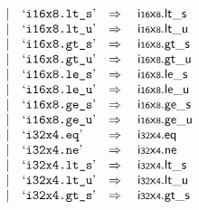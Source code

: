 $$\begin{array}[t]{@{}lrrl@{}l@{}l@{}l@{}}
& & | & \mbox{‘\texttt{i16x8.lt\_s}’} & \quad\Rightarrow\quad{} & {\mathsf{i{\scriptstyle 16}}}{\mathsf{x}}{\mathsf{{\scriptstyle 8}}} {.} {\mathsf{lt}}{\mathsf{\_}}{\mathsf{s}} \\
& & | & \mbox{‘\texttt{i16x8.lt\_u}’} & \quad\Rightarrow\quad{} & {\mathsf{i{\scriptstyle 16}}}{\mathsf{x}}{\mathsf{{\scriptstyle 8}}} {.} {\mathsf{lt}}{\mathsf{\_}}{\mathsf{u}} \\
& & | & \mbox{‘\texttt{i16x8.gt\_s}’} & \quad\Rightarrow\quad{} & {\mathsf{i{\scriptstyle 16}}}{\mathsf{x}}{\mathsf{{\scriptstyle 8}}} {.} {\mathsf{gt}}{\mathsf{\_}}{\mathsf{s}} \\
& & | & \mbox{‘\texttt{i16x8.gt\_u}’} & \quad\Rightarrow\quad{} & {\mathsf{i{\scriptstyle 16}}}{\mathsf{x}}{\mathsf{{\scriptstyle 8}}} {.} {\mathsf{gt}}{\mathsf{\_}}{\mathsf{u}} \\
& & | & \mbox{‘\texttt{i16x8.le\_s}’} & \quad\Rightarrow\quad{} & {\mathsf{i{\scriptstyle 16}}}{\mathsf{x}}{\mathsf{{\scriptstyle 8}}} {.} {\mathsf{le}}{\mathsf{\_}}{\mathsf{s}} \\
& & | & \mbox{‘\texttt{i16x8.le\_u}’} & \quad\Rightarrow\quad{} & {\mathsf{i{\scriptstyle 16}}}{\mathsf{x}}{\mathsf{{\scriptstyle 8}}} {.} {\mathsf{le}}{\mathsf{\_}}{\mathsf{u}} \\
& & | & \mbox{‘\texttt{i16x8.ge\_s}’} & \quad\Rightarrow\quad{} & {\mathsf{i{\scriptstyle 16}}}{\mathsf{x}}{\mathsf{{\scriptstyle 8}}} {.} {\mathsf{ge}}{\mathsf{\_}}{\mathsf{s}} \\
& & | & \mbox{‘\texttt{i16x8.ge\_u}’} & \quad\Rightarrow\quad{} & {\mathsf{i{\scriptstyle 16}}}{\mathsf{x}}{\mathsf{{\scriptstyle 8}}} {.} {\mathsf{ge}}{\mathsf{\_}}{\mathsf{u}} \\
& & | & \mbox{‘\texttt{i32x4.eq}’} & \quad\Rightarrow\quad{} & {\mathsf{i{\scriptstyle 32}}}{\mathsf{x}}{\mathsf{{\scriptstyle 4}}} {.} \mathsf{eq} \\
& & | & \mbox{‘\texttt{i32x4.ne}’} & \quad\Rightarrow\quad{} & {\mathsf{i{\scriptstyle 32}}}{\mathsf{x}}{\mathsf{{\scriptstyle 4}}} {.} \mathsf{ne} \\
& & | & \mbox{‘\texttt{i32x4.lt\_s}’} & \quad\Rightarrow\quad{} & {\mathsf{i{\scriptstyle 32}}}{\mathsf{x}}{\mathsf{{\scriptstyle 4}}} {.} {\mathsf{lt}}{\mathsf{\_}}{\mathsf{s}} \\
& & | & \mbox{‘\texttt{i32x4.lt\_u}’} & \quad\Rightarrow\quad{} & {\mathsf{i{\scriptstyle 32}}}{\mathsf{x}}{\mathsf{{\scriptstyle 4}}} {.} {\mathsf{lt}}{\mathsf{\_}}{\mathsf{u}} \\
& & | & \mbox{‘\texttt{i32x4.gt\_s}’} & \quad\Rightarrow\quad{} & {\mathsf{i{\scriptstyle 32}}}{\mathsf{x}}{\mathsf{{\scriptstyle 4}}} {.} {\mathsf{gt}}{\mathsf{\_}}{\mathsf{s}} \\

\end{array}$$
